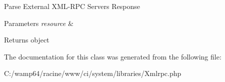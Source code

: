 Parse External X\+M\+L-\/\+R\+PC Server\textquotesingle{}s Response


\begin{DoxyParams}{Parameters}
{\em resource} & \\
\hline
\end{DoxyParams}
\begin{DoxyReturn}{Returns}
object 
\end{DoxyReturn}


The documentation for this class was generated from the following file\+:\begin{DoxyCompactItemize}
\item 
C\+:/wamp64/racine/www/ci/system/libraries/Xmlrpc.\+php\end{DoxyCompactItemize}
